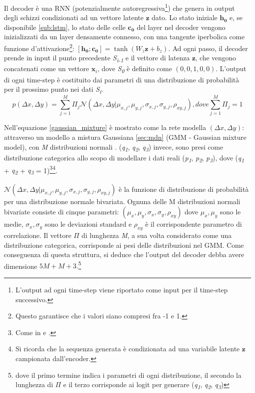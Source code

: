 Il decoder è una RNN (potenzialmente autoregressiva\footnote{L'output ad ogni time-step viene riportato come input per il time-step successivo.}) che genera in output degli schizzi condizionati ad un vettore latente $\boldsymbol{z}$ dato. Lo stato iniziale $\boldsymbol{h_0}$ e, se disponibile \ref{sub:lstm}, lo stato delle celle $\boldsymbol{c_0}$ del layer nel decoder vengono inizializzati da un layer densamente connesso, con una tangente iperbolica come funzione d'attivazione\footnote{Questo garantisce che i valori siano compresi fra -1 e 1.}: $[\boldsymbol{h_0} ; \boldsymbol{c_0}] = \tanh(W_z \boldsymbol{z} + b_z)$.
Ad ogni passo, il decoder prende in input il punto precedente \textit{S\textsubscript{i-1}} e il vettore di latenza $\boldsymbol{z}$, che vengono concatenati come un vettore $\boldsymbol{x}_i$, dove \textit{S\textsubscript{0}} è definito come $(0, 0, 1, 0, 0)$. L'output di ogni time-step è costituito dai parametri di una distribuzione di probabilità per il prossimo punto nei dati \textit{S\textsubscript{i}}.
\begin{equation}
	\label{gaussian_mixture}
	p(\Delta x, \Delta y) = \sum_{j=1}^M \Pi_j \mathcal{N}(\Delta x, \Delta y | \mu_{x,j}, \mu_{y,j}, \sigma_{x,j}, \sigma_{y,j}, \rho_{xy, j}), dove \sum_{j=1}^M \Pi_j = 1
\end{equation}

Nell'equazione \ref{gaussian_mixture} è mostrato come la rete modella $(\Delta x, \Delta y)$: attraverso un modello a mistura Gaussiana \ref{sec:mdn} (GMM - Gaussian mixture model), con \textit{M} distribuzioni normali \cite{gmm}. (\textit{q\textsubscript{1}}, \textit{q\textsubscript{2}}, \textit{q\textsubscript{3}}) invece, sono presi come distribuzione categorica allo scopo di modellare i dati reali (\textit{p\textsubscript{1}}, \textit{p\textsubscript{2}}, \textit{p\textsubscript{3}}), dove (\textit{q\textsubscript{1}} + \textit{q\textsubscript{2}} + \textit{q\textsubscript{3}} = 1)\footnote{Come in \cite{fake_chinese} e \cite{draw_chinese}.}\footnote{Si ricorda che la sequenza generata è condizionata ad una variabile latente $\boldsymbol{z}$ campionata dall'encoder.}.

$\mathcal{N}(\Delta x, \Delta y | \mu_{x,j}, \mu_{y,j}, \sigma_{x,j}, \sigma_{y,j}, \rho_{xy, j})$ è la funzione di distribuzione di probabilità per una distribuzione normale bivariata. Ognuna delle M distribuzioni normali bivariate consiste di cinque parametri: $(\mu_{x}, \mu_{y}, \sigma_{x}, \sigma_{y}, \rho_{xy})$ dove $\mu_{x}, \mu_{y}$ sono le medie, $\sigma_{x}, \sigma_{y}$ sono le deviazioni standard e $\rho_{xy}$ è il corrispondente parametro di correlazione. Il vettore $\Pi$ di lunghezza \textit{M}, a sua volta considerato come una distribuzione categorica, corrisponde ai pesi delle distribuzioni nel GMM. Come conseguenza di questa struttura, si deduce che l'output del decoder debba avere dimensione $5M + M + 3.$\footnote{dove il primo termine indica i parametri di ogni distribuzione, il secondo la lunghezza di $\Pi$ e il terzo corrisponde ai logit per generare (\textit{q\textsubscript{1}}, \textit{q\textsubscript{2}}, \textit{q\textsubscript{3}})}

